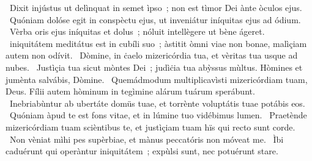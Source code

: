\psalmChapterWithInscription{}
{ }
{%
~Dixit injústus ut delìnquat in semet ìpso~; non est tìmor Dei ànte òculos ejus. 
~Quóniam dolóse egit in conspèctu ejus, ut inveniátur iníquitas ejus ad ódium. 
~Vèrba oris ejus iníquitas et dolus~; nóluit intellègere ut bène ágeret. 
~iniquitátem meditátus est in cubíli suo~; àstitit òmni viae non bonae, malìçiam autem non odívit. 
~Dòmine, in ċaelo mizericórdia tua, et vèritas tua usque ad nubes. 
~Justìçia tua sicut mòntes Dei~; judìċia tua abỳssus mùltus. Hòmines et jumènta salvábis, Dòmine. 
~Quemádmodum multiplicavìsti mizericórdiam tuam, Deus. Fílii autem hòminum in tegìmine alárum tuárum sperábunt. 
~Inebriabùntur ab ubertáte domüs tuae, et torrènte voluptátis tuae potábis eos. 
~Quóniam àpud te est fons vitae, et in lúmine tuo vidébimus lumen. 
~Praetènde mizericórdiam tuam scièntibus te, et justìçiam tuam hïs qui recto sunt corde. 
~Non vèniat mìhi pes supèrbiae, et mànus peccatóris non móveat me. 
~Ìbi caduérunt qui operàntur iniquitátem~; expùlsi sunt, nec potuérunt stare. 
}

